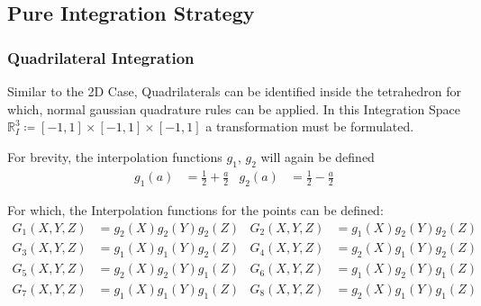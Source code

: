 \documentclass{mitschrift}
\newcommand{\R}{\mathbb{R}}
\begin{document}
\subsection{Pure Integration Strategy}

\subsubsection{Quadrilateral Integration}

Similar to the 2D Case, Quadrilaterals can be identified inside the tetrahedron for which, normal gaussian quadrature rules can be applied.
In this Integration Space $\R^3_{I}\coloneq [-1,1]\times[-1,1]\times[-1,1]$ a transformation must be formulated.

For brevity, the interpolation functions $g_1,\, g_2$ will again be defined \begin{align}
    g_1(a) &= \frac{1}{2} + \frac{a}{2} & g_2(a) &= \frac{1}{2} - \frac{a}{2} 
\end{align}

For which, the Interpolation functions for the points can be defined: \begin{align}
    G_1(X,Y,Z) &= g_2(X)g_2(Y)g_2(Z) & G_2(X,Y,Z) &= g_1(X)g_2(Y)g_2(Z) \\
    G_3(X,Y,Z) &= g_1(X)g_1(Y)g_2(Z) & G_4(X,Y,Z) &= g_2(X)g_1(Y)g_2(Z) \\
    G_5(X,Y,Z) &= g_2(X)g_2(Y)g_1(Z) & G_6(X,Y,Z) &= g_1(X)g_2(Y)g_1(Z) \\
    G_7(X,Y,Z) &= g_1(X)g_1(Y)g_1(Z) & G_8(X,Y,Z) &= g_2(X)g_1(Y)g_1(Z)
\end{align}
\end{document}
